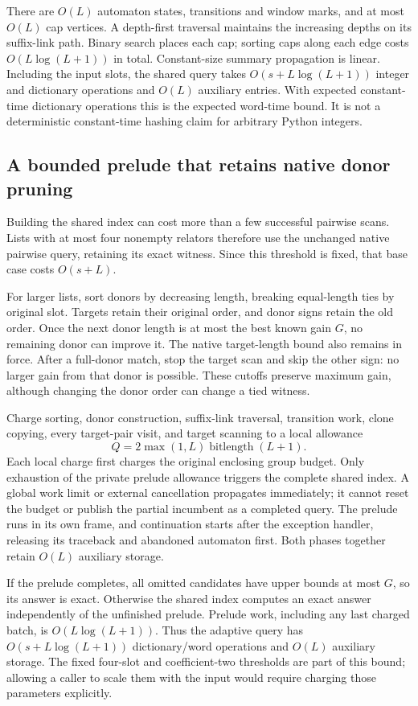 There are $O(L)$ automaton states, transitions and window marks, and at most
$O(L)$ cap vertices. A depth-first traversal maintains the increasing depths
on its suffix-link path. Binary search places each cap; sorting caps along
each edge costs $O(L\log(L+1))$ in total. Constant-size summary propagation
is linear. Including the input slots, the shared query takes
$O(s+L\log(L+1))$ integer and dictionary operations and $O(L)$ auxiliary
entries. With expected constant-time dictionary operations this is the
expected word-time bound. It is not a deterministic constant-time hashing
claim for arbitrary Python integers.

\subsection{A bounded prelude that retains native donor pruning}

Building the shared index can cost more than a few successful pairwise
scans. Lists with at most four nonempty relators therefore use the unchanged
native pairwise query, retaining its exact witness. Since this threshold is
fixed, that base case costs $O(s+L)$.

For larger lists, sort donors by decreasing length, breaking equal-length
ties by original slot. Targets retain their original order, and donor signs
retain the old order. Once the next donor length is at most the best known
gain $G$, no remaining donor can improve it. The native target-length bound
also remains in force. After a full-donor match, stop the target scan and
skip the other sign: no larger gain from that donor is possible. These
cutoffs preserve maximum gain, although changing the donor order can change
a tied witness.

Charge sorting, donor construction, suffix-link traversal, transition work,
clone copying, every target-pair visit, and target scanning to a local
allowance
\[
 Q=2\max(1,L)\operatorname{bitlength}(L+1).
\]
Each local charge first charges the original enclosing group budget. Only
exhaustion of the private prelude allowance triggers the complete shared
index. A global work limit or external cancellation propagates immediately;
it cannot reset the budget or publish the partial incumbent as a completed
query. The prelude runs in its own frame, and continuation starts after the
exception handler, releasing its traceback and abandoned automaton first.
Both phases together retain $O(L)$ auxiliary storage.

If the prelude completes, all omitted candidates have upper bounds at most
$G$, so its answer is exact. Otherwise the shared index computes an exact
answer independently of the unfinished prelude. Prelude work, including
any last charged batch, is $O(L\log(L+1))$. Thus the adaptive query has
$O(s+L\log(L+1))$ dictionary/word operations and $O(L)$ auxiliary storage.
The fixed four-slot and coefficient-two thresholds are part of this bound;
allowing a caller to scale them with the input would require charging those
parameters explicitly.

